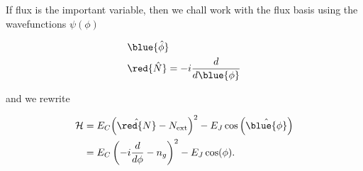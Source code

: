 \newpage\subsubsection{}
If flux is the important variable, then we chall work with the flux basis using the wavefunctions $ \psi(\phi) $

\begin{framed}\noindent

  \begin{equation}\label{key}
    \begin{aligned}
      &\blue{\hat{\phi}} \qquad\\
      &\red{\hat{N}} = -i\frac{d}{d\blue{\phi}}
    \end{aligned}
  \end{equation}

\end{framed}
\noindent and we rewrite

\begin{equation}\label{key}
  \begin{aligned}
    \mathcal{H} & = E_C{\left(\hat{\red{N}}-N_\text{ext}\right)^2}- E_J\cos\left(\hat{\blue{\phi}}\right)\\
    & = E_C\left(-i\frac{d}{d\phi} - n_g\right)^2 - E_J\cos(\phi).
  \end{aligned}
\end{equation}

